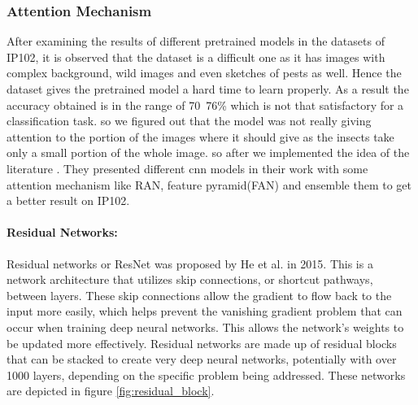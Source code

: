 \subsubsection{Attention Mechanism}
After examining the results of different pretrained models in the datasets of IP102, it is observed that the dataset is a difficult one as it has images with complex background, wild images and even sketches of pests as well. Hence the dataset gives the pretrained model a hard time to learn properly. As a result the accuracy obtained is in the range of 70~76\% which is not that satisfactory for a classification task. so we figured out that the model was not really giving attention to the portion of the images where it should give as the insects take only a small portion of the whole image. so after we implemented the idea of the literature \cite{ung2021efficient}. They presented different cnn models in their work with some attention mechanism like RAN, feature pyramid(FAN) and ensemble them to get a better result on IP102.

\paragraph{Residual Networks:}
Residual networks or ResNet \cite{he2015deep} was proposed by He et al. in 2015. This is a network architecture that utilizes skip connections, or shortcut pathways, between layers. These skip connections allow the gradient to flow back to the input more easily, which helps prevent the vanishing gradient problem that can occur when training deep neural networks. This allows the network's weights to be updated more effectively. Residual networks are made up of residual blocks that can be stacked to create very deep neural networks, potentially with over 1000 layers, depending on the specific problem being addressed. These networks are depicted in figure \ref{fig:residual_block}.

